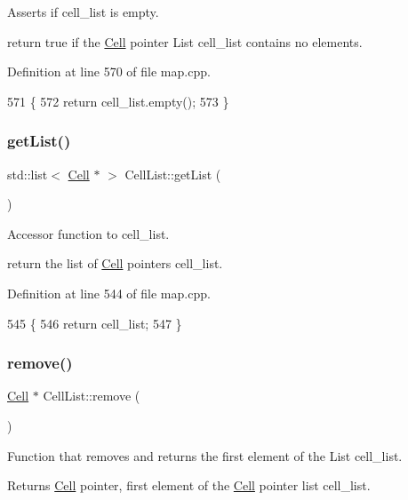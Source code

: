Asserts if cell\+\_\+list is empty. 

return true if the \hyperlink{class_cell}{Cell} pointer List cell\+\_\+list contains no elements. 

Definition at line 570 of file map.\+cpp.


\begin{DoxyCode}
571 \{
572     \textcolor{keywordflow}{return} cell\_list.empty();
573 \}
\end{DoxyCode}
\hypertarget{class_cell_list_aa5fee7de166143e16a0ec1f20349db55}{}\label{class_cell_list_aa5fee7de166143e16a0ec1f20349db55} 
\subsubsection{\texorpdfstring{get\+List()}{getList()}}
{\footnotesize\ttfamily std\+::list$<$ \hyperlink{class_cell}{Cell} $\ast$ $>$ Cell\+List\+::get\+List (\begin{DoxyParamCaption}{ }\end{DoxyParamCaption})}



Accessor function to cell\+\_\+list. 

return the list of \hyperlink{class_cell}{Cell} pointers cell\+\_\+list. 

Definition at line 544 of file map.\+cpp.


\begin{DoxyCode}
545 \{
546     \textcolor{keywordflow}{return} cell\_list;
547 \}
\end{DoxyCode}
\hypertarget{class_cell_list_abc7337272382af9d9782628666f9e594}{}\label{class_cell_list_abc7337272382af9d9782628666f9e594} 
\subsubsection{\texorpdfstring{remove()}{remove()}}
{\footnotesize\ttfamily \hyperlink{class_cell}{Cell} $\ast$ Cell\+List\+::remove (\begin{DoxyParamCaption}{ }\end{DoxyParamCaption})}



Function that removes and returns the first element of the List cell\+\_\+list. 

\begin{DoxyReturn}{Returns}
\hyperlink{class_cell}{Cell} pointer, first element of the \hyperlink{class_cell}{Cell} pointer list cell\+\_\+list. 
\end{DoxyReturn}


